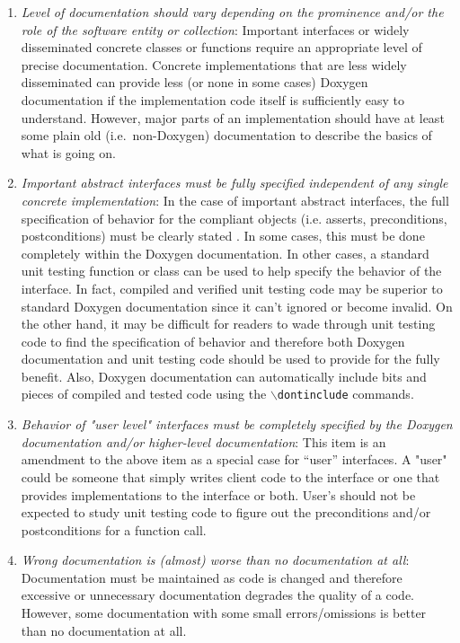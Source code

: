 \begin{enumerate}

{}\item\textit{Level of documentation should vary depending on the prominence
and/or the role of the software entity or collection}: Important interfaces or
widely disseminated concrete classes or functions require an appropriate level
of precise documentation.  Concrete implementations that are less widely
disseminated can provide less (or none in some cases) Doxygen documentation if
the implementation code itself is sufficiently easy to understand.  However,
major parts of an implementation should have at least some plain old (i.e.\
non-Doxygen) documentation to describe the basics of what is going on.

{}\item\textit{Important abstract interfaces must be fully specified
independent of any single concrete implementation}: In the case of important
abstract interfaces, the full specification of behavior for the compliant
objects (i.e. asserts, preconditions, postconditions) must be clearly stated
{}\cite[Item 69]{C++CodingStandards05}.  In some cases, this must be done
completely within the Doxygen documentation.  In other cases, a standard unit
testing function or class can be used to help specify the behavior of the
interface.  In fact, compiled and verified unit testing code may be superior
to standard Doxygen documentation since it can't ignored or become invalid.
On the other hand, it may be difficult for readers to wade through unit
testing code to find the specification of behavior and therefore both Doxygen
documentation and unit testing code should be used to provide for the fully
benefit.  Also, Doxygen documentation can automatically include bits and
pieces of compiled and tested code using the
{}\texttt{$\backslash$dontinclude} commands.

{}\item\textit{Behavior of "user level" interfaces must be completely
specified by the Doxygen documentation and/or higher-level documentation}:
This item is an amendment to the above item as a special case for ``user''
interfaces.  A "user" could be someone that simply writes client code to the
interface or one that provides implementations to the interface or both.
User's should not be expected to study unit testing code to figure out the
preconditions and/or postconditions for a function call.

{}\item\textit{Wrong documentation is (almost) worse than no documentation at
all}: Documentation must be maintained as code is changed and therefore
excessive or unnecessary documentation degrades the quality of a code.
However, some documentation with some small errors/omissions is better than no
documentation at all.


\end{enumerate}
